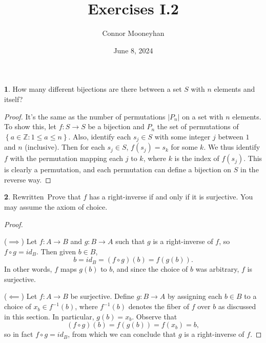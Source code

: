 \documentclass{article}
\title{Exercises I.2}
\author{Connor Mooneyhan}
\date{June 8, 2024}
\newcounter{section-number}
\theoremstyle{definition}
\newtheorem{ex}{}[section-number]
\begin{document}
\maketitle

\begin{ex}
	How many different bijections are there between a set $S$ with $n$ elements and itself?
\end{ex}
\begin{proof}
	It's the same as the number of permutations $|P_n|$ on a set with $n$ elements.
	To show this, let $f: S \to S$ be a bijection and $P_n$ the set of permutations of $\left\lbrace a \in \mathbb{Z} : 1 \leq a \leq n \right\rbrace$.
	Also, identify each $s_j \in S$ with some integer $j$ between $1$ and $n$ (inclusive).
	Then for each $s_j \in S$, $f(s_j) = s_k$ for some $k$.
	We thus identify $f$ with the permutation mapping each $j$ to $k$, where $k$ is the index of $f(s_j)$.
	This is clearly a permutation, and each permutation can define a bijection on $S$ in the reverse way.
\end{proof}

\begin{ex}
	\lbrack Rewritten\rbrack\
	Prove that $f$ has a right-inverse if and only if it is surjective.
	You may assume the axiom of choice.
\end{ex}
\begin{proof}\

	($\implies$) Let $f: A \to B$ and $g: B \to A$ such that $g$ is a right-inverse of $f$, so $f \circ g = id_B$.
	Then given $b \in B$, \begin{equation*}
		b = id_B = (f \circ g)(b) = f(g(b)).
	\end{equation*}
	In other words, $f$ maps $g(b)$ to $b$, and since the choice of $b$ was arbitrary, $f$ is surjective.

	($\impliedby$) Let $f: A \to B$ be surjective.
	Define $g: B \to A$ by assigning each $b \in B$ to a choice of $x_b \in f^{-1}(b)$, where $f^{-1}(b)$ denotes the fiber of $f$ over $b$ as discussed in this section.
	In particular, $g(b) = x_b$.
	Observe that \begin{equation*}
		(f \circ g)(b) = f(g(b)) = f(x_b) = b,
	\end{equation*}
	so in fact $f \circ g = id_B$, from which we can conclude that $g$ is a right-inverse of $f$.
\end{proof}
\end{document}
